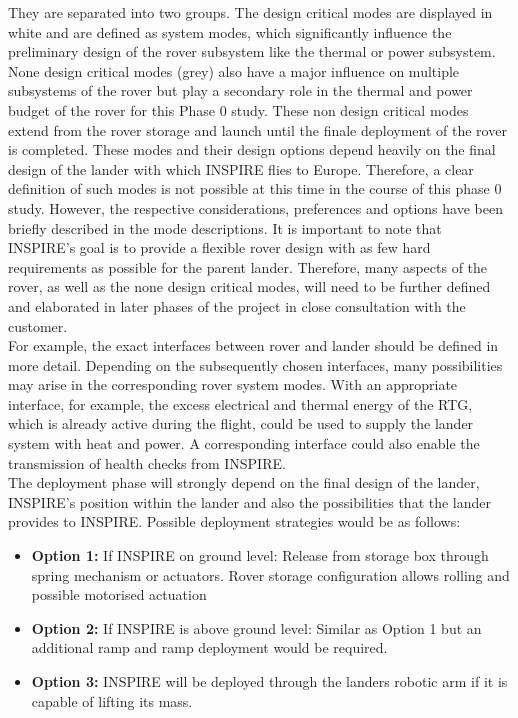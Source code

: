 They are separated into two groups. The design critical modes are displayed in white and are defined as system modes, which significantly influence the preliminary design of the rover subsystem like the thermal or power subsystem. None design critical modes (grey) also have a major influence on multiple subsystems of the rover but play a secondary role in the thermal and power budget of the rover for this Phase 0 study. These non design critical modes extend from the rover storage and launch until the finale deployment of the rover is completed. These modes and their design options depend heavily on the final design of the lander with which INSPIRE flies to Europe. Therefore, a clear definition of such modes is not possible at this time in the course of this phase 0 study. However, the respective considerations, preferences and options have been briefly described in the mode descriptions. It is important to note that INSPIRE's goal is to provide a flexible rover design with as few hard requirements as possible for the parent lander. Therefore, many aspects of the rover, as well as the none design critical modes, will need to be further defined and elaborated in later phases of the project in close consultation with the customer. \\
For example, the exact interfaces between rover and lander should be defined in more detail. Depending on the subsequently chosen interfaces, many possibilities may arise in the corresponding rover system modes. With an appropriate interface, for example, the excess electrical and thermal energy of the RTG, which is already active during the flight, could be used to supply the lander system with heat and power. A corresponding interface could also enable the transmission of health checks from INSPIRE. \\
The deployment phase will strongly depend on the final design of the lander, INSPIRE's position within the lander and also the possibilities that the lander provides to INSPIRE.
Possible deployment strategies would be as follows:

\begin{itemize}
\itemsep0pt
\item	\textbf{Option 1:} If INSPIRE on ground level: Release from storage box through spring mechanism or actuators. Rover storage configuration allows rolling and possible motorised actuation
\item	\textbf{Option 2:} If INSPIRE is above ground level: Similar as Option 1 but an additional ramp and ramp deployment would be required.
\item	\textbf{Option 3:} INSPIRE will be deployed through the landers robotic arm if it is capable of lifting its mass.
\end{itemize}
